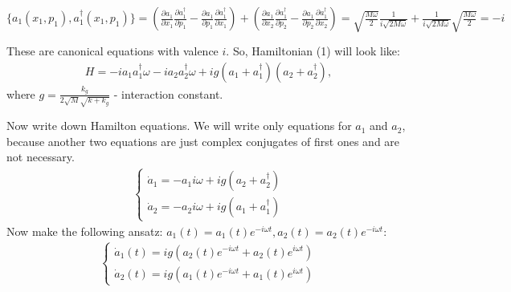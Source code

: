 \documentclass[]{article}
\begin{document}
$\{a_1(x_1, p_1), a_1^\dag(x_1, p_1)\}=\left(\frac{\partial a_1}{\partial x_1} \frac{\partial a_1^\dag}{\partial p_1} - \frac{\partial a_1}{\partial p_1} \frac{\partial a_1^\dag}{\partial x_1}\right) + \left(\frac{\partial a_1}{\partial x_2} \frac{\partial a_1^\dag}{\partial p_2} - \frac{\partial a_1}{\partial p_2} \frac{\partial a_1^\dag}{\partial x_2} \right) = \sqrt{\frac{M\omega}{2}} \frac{1}{i\sqrt{2M\omega}}+\frac{1}{i \sqrt{2M \omega}} \sqrt{\frac{M \omega}{2}}=-i$\newline

These are canonical equations with valence $i$.
So, Hamiltonian (1) will look like:
\begin{align*}
	H=-i a_1 a_1^\dag \omega - i a_2 a_2^\dag \omega + ig(a_1+a_1^\dag)(a_2+a_2^\dag),
\end{align*}
where $g = \frac{k_g}{2\sqrt{M}\sqrt{k+k_g}}$ - interaction constant.\newline

Now write down Hamilton equations. We will write only equations for $a_1$ and $a_2$, because another two equations are just complex conjugates of first ones and are not necessary.
\begin{align*}
	\begin{cases}
		\dot a_1 = -a_1 i \omega + ig(a_2 + a_2^\dag)
		\\
		\dot a_2 = -a_2 i \omega + ig(a_1 + a_1^\dag)
	\end{cases}
\end{align*}
Now make the following ansatz: $a_1(t) = a_1(t)e^{-i\omega t}, a_2(t) = a_2(t)e^{-i\omega t}$:
\begin{align*}
	\begin{cases}
		\dot a_1(t) = ig(a_2(t)e^{-i\omega t} + a_2(t)e^{i\omega t})
		\\
		\dot a_2(t) = ig(a_1(t)e^{-i\omega t} + a_1(t)e^{i\omega t})
	\end{cases}
\end{align*}
\end{document}
